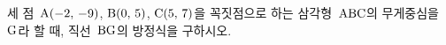 세 점~$\mathrm{A}(-2,\mkern3mu -9)$, $\mathrm{B}(0,\mkern3mu 5)$, $\mathrm{C}(5,\mkern3mu 7)$을 꼭짓점으로 하는 삼각형~$\mathrm{ABC}$의 무게중심을 $\mathrm{G}$라 할 때, 직선~$\mathrm{BG}$의 방정식을 구하시오.
